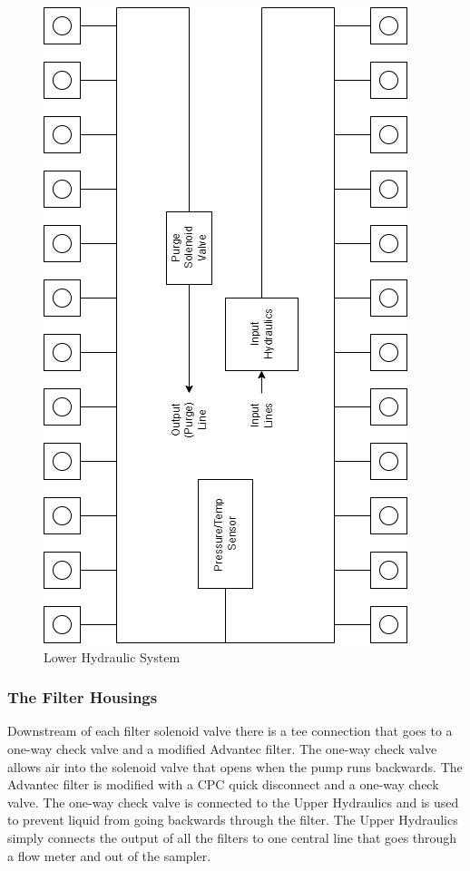 \documentclass[11pt, letterpaper]{article}
\begin{document}
\begin{figure}[H] %
	\centering
	\includegraphics[scale=0.65, angle=-90]{./Assets/PolyWAG_HX_HD_LHR.png}
	\caption{Lower Hydraulic System}
\end{figure}


\subsubsection{The Filter Housings}
Downstream of each filter solenoid valve there is a tee connection that goes to a one-way check valve and a modified Advantec filter. The one-way check valve allows air into the solenoid valve that opens when the pump runs backwards. The Advantec filter is modified with a CPC quick disconnect and a one-way check valve. The one-way check valve is connected to the Upper Hydraulics and is used to prevent liquid from going backwards through the filter. The Upper Hydraulics simply connects the output of all the filters to one central line that goes through a flow meter and out of the sampler. 
\end{document}

